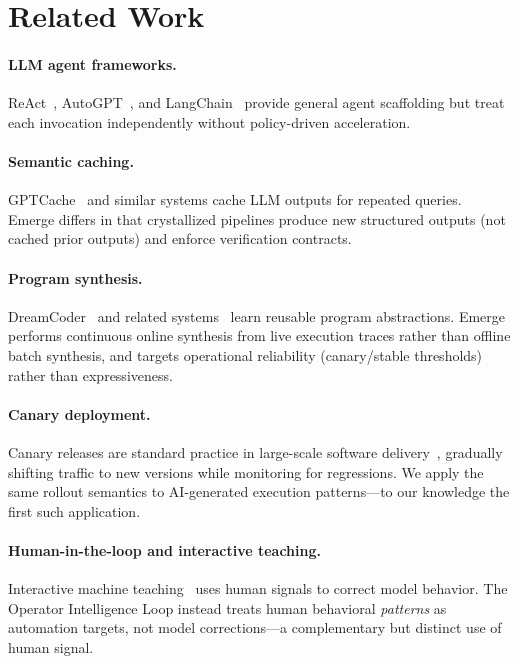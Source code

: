\documentclass[11pt,a4paper]{article}
\begin{document}
\section{Related Work}

\paragraph{LLM agent frameworks.}
ReAct~\cite{yao2022react}, AutoGPT~\cite{significant2023autogpt}, and LangChain~\cite{langchain2022}
provide general agent scaffolding but treat each invocation independently without policy-driven acceleration.

\paragraph{Semantic caching.}
GPTCache~\cite{bang2023gptcache} and similar systems cache LLM outputs for repeated queries.
Emerge differs in that crystallized pipelines produce new structured outputs (not cached prior outputs)
and enforce verification contracts.

\paragraph{Program synthesis.}
DreamCoder~\cite{ellis2021dreamcoder} and related systems~\cite{gulwani2017program} learn reusable program
abstractions.
Emerge performs continuous online synthesis from live execution traces rather than offline batch synthesis,
and targets operational reliability (canary/stable thresholds) rather than expressiveness.

\paragraph{Canary deployment.}
Canary releases are standard practice in large-scale software delivery~\cite{humble2010continuous},
gradually shifting traffic to new versions while monitoring for regressions.
We apply the same rollout semantics to AI-generated execution patterns---to our knowledge the first such application.

\paragraph{Human-in-the-loop and interactive teaching.}
Interactive machine teaching~\cite{simard2017imt} uses human signals to correct model behavior.
The Operator Intelligence Loop instead treats human behavioral \emph{patterns} as automation targets,
not model corrections---a complementary but distinct use of human signal.
\end{document}
